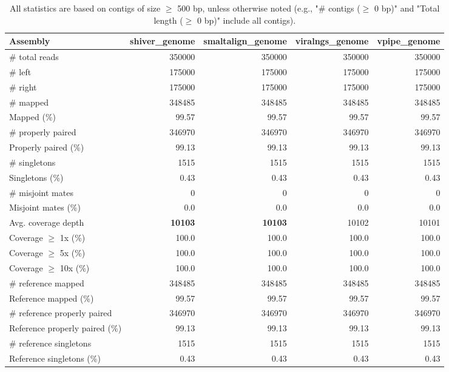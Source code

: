 \documentclass[12pt,a4paper]{article}
\begin{document}
\begin{table}[ht]
\begin{center}
\caption{All statistics are based on contigs of size $\geq$ 500 bp, unless otherwise noted (e.g., "\# contigs ($\geq$ 0 bp)" and "Total length ($\geq$ 0 bp)" include all contigs).}
\begin{tabular}{|l*{4}{|r}|}
\hline
Assembly & shiver\_genome & smaltalign\_genome & viralngs\_genome & vpipe\_genome \\ \hline
\# total reads & 350000 & 350000 & 350000 & 350000 \\ \hline
\# left & 175000 & 175000 & 175000 & 175000 \\ \hline
\# right & 175000 & 175000 & 175000 & 175000 \\ \hline
\# mapped & 348485 & 348485 & 348485 & 348485 \\ \hline
Mapped (\%) & 99.57 & 99.57 & 99.57 & 99.57 \\ \hline
\# properly paired & 346970 & 346970 & 346970 & 346970 \\ \hline
Properly paired (\%) & 99.13 & 99.13 & 99.13 & 99.13 \\ \hline
\# singletons & 1515 & 1515 & 1515 & 1515 \\ \hline
Singletons (\%) & 0.43 & 0.43 & 0.43 & 0.43 \\ \hline
\# misjoint mates & 0 & 0 & 0 & 0 \\ \hline
Misjoint mates (\%) & 0.0 & 0.0 & 0.0 & 0.0 \\ \hline
Avg. coverage depth & {\bf 10103} & {\bf 10103} & 10102 & 10101 \\ \hline
Coverage $\geq$ 1x (\%) & 100.0 & 100.0 & 100.0 & 100.0 \\ \hline
Coverage $\geq$ 5x (\%) & 100.0 & 100.0 & 100.0 & 100.0 \\ \hline
Coverage $\geq$ 10x (\%) & 100.0 & 100.0 & 100.0 & 100.0 \\ \hline
\# reference mapped & 348485 & 348485 & 348485 & 348485 \\ \hline
Reference mapped (\%) & 99.57 & 99.57 & 99.57 & 99.57 \\ \hline
\# reference properly paired & 346970 & 346970 & 346970 & 346970 \\ \hline
Reference properly paired (\%) & 99.13 & 99.13 & 99.13 & 99.13 \\ \hline
\# reference singletons & 1515 & 1515 & 1515 & 1515 \\ \hline
Reference singletons (\%) & 0.43 & 0.43 & 0.43 & 0.43 \\ \hline

\end{tabular}
\end{center}
\end{table}
\end{document}
